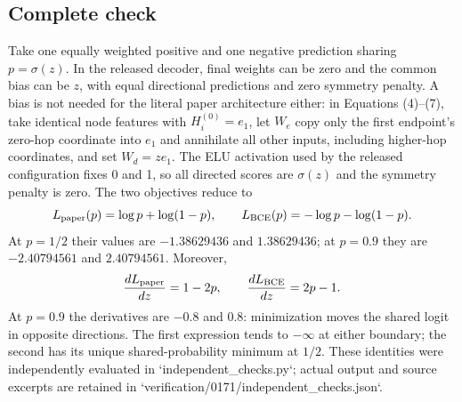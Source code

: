 \documentclass[10pt]{article}
\begin{document}
\subsection*{Complete check}
Take one equally weighted positive and one negative prediction sharing \(p=\sigma(z)\). In the released decoder, final weights can be zero and the common bias can be \(z\), with equal directional predictions and zero symmetry penalty. A bias is not needed for the literal paper architecture either: in Equations (4)–(7), take identical node features with \(H_i^{(0)}=e_1\), let \(W_e\) copy only the first endpoint’s zero-hop coordinate into \(e_1\) and annihilate all other inputs, including higher-hop coordinates, and set \(W_d=ze_1\). The ELU activation used by the released configuration fixes 0 and 1, so all directed scores are \(\sigma(z)\) and the symmetry penalty is zero. The two objectives reduce to \[L_{\rm paper}(p)=\log p+\log(1-p),\qquad
L_{\rm BCE}(p)=-\log p-\log(1-p).\] At \(p=1/2\) their values are \(-1.38629436\) and \(1.38629436\); at \(p=0.9\) they are \(-2.40794561\) and \(2.40794561\). Moreover, \[\frac{dL_{\rm paper}}{dz}=1-2p,\qquad
\frac{dL_{\rm BCE}}{dz}=2p-1.\] At \(p=0.9\) the derivatives are \(-0.8\) and \(0.8\): minimization moves the shared logit in opposite directions. The first expression tends to \(-\infty\) at either boundary; the second has its unique shared-probability minimum at \(1/2\). These identities were independently evaluated in `independent\_checks.py`; actual output and source excerpts are retained in `verification/0171/independent\_checks.json`.\par
\end{document}
